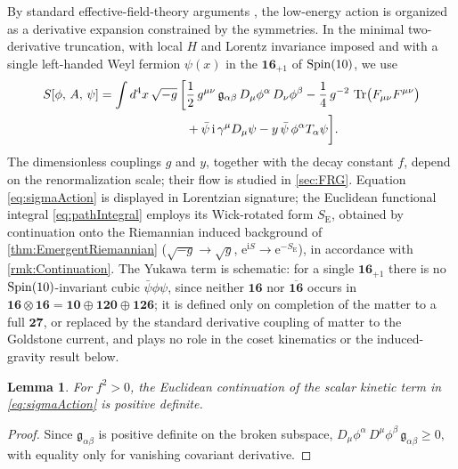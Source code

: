 \documentclass[pdflatex,sn-mathphys-num]{sn-jnl}
\theoremstyle{thmstyleone}
\newtheorem{lemma}[lemma]{Lemma}
\theoremstyle{thmstylethree}%
\theoremstyle{thmstyletwo}%
\begin{document}
By standard effective-field-theory arguments \cite{CWZ69,Weinberg:1996kr}, the
low-energy action is organized as a derivative expansion constrained by the
symmetries. In the minimal two-derivative truncation, with local \(H\) and
Lorentz invariance imposed and with a single left-handed Weyl fermion
\(\psi(x)\) in the \(\mathbf{16}_{+1}\) of \(\operatorname{Spin}(10)\), we use
\begin{equation}\label{eq:sigmaAction}
\begin{aligned}
  S[\phi,\,A,\,\psi]
  = \int d^{4}x\,\sqrt{-g}\,\biggl[
    & \frac12\,g^{\mu\nu}\,\mathfrak g_{\alpha\beta}\,
      D_{\mu}\phi^{\alpha}\,D_{\nu}\phi^{\beta}
    -\frac14\,g^{-2}\,\operatorname{Tr}\bigl(F_{\mu\nu}F^{\mu\nu}\bigr)\\
    & + \bar\psi\,\mathrm i\,\gamma^{\mu}D_{\mu}\psi
    -y\,\bar\psi\,\phi^{\alpha}T_{\alpha}\psi
  \biggr].
\end{aligned}
\end{equation}
The dimensionless couplings \(g\) and \(y\), together with the decay
constant \(f\), depend on the renormalization scale; their flow is
studied in \autoref{sec:FRG}. Equation \eqref{eq:sigmaAction} is displayed in
Lorentzian signature; the Euclidean functional integral \eqref{eq:pathIntegral}
employs its Wick-rotated form \(S_{\mathrm E}\), obtained by continuation onto
the Riemannian induced background of \autoref{thm:EmergentRiemannian}
(\(\sqrt{-g}\to\sqrt{g}\),
\(\mathrm{e}^{\mathrm{i}S}\to\mathrm{e}^{-S_{\mathrm E}}\)), in accordance with
\autoref{rmk:Continuation}. The Yukawa term is schematic: for a single
\(\mathbf{16}_{+1}\) there is no \(\operatorname{Spin}(10)\)-invariant cubic
\(\bar\psi\phi\psi\), since neither \(\mathbf{16}\) nor \(\overline{\mathbf{16}}\)
occurs in \(\mathbf{16}\otimes\mathbf{16}
=\mathbf{10}\oplus\mathbf{120}\oplus\mathbf{126}\); it is defined only on
completion of the matter to a full \(\mathbf{27}\), or replaced by the standard
derivative coupling of matter to the Goldstone current, and plays no role in
the coset kinematics or the induced-gravity result below.

\begin{lemma}\label{lem:positivity}
For $f^{2}>0$, the Euclidean continuation of the scalar kinetic term in
\eqref{eq:sigmaAction} is positive definite.
\end{lemma}
\begin{proof}
Since $\mathfrak g_{\alpha\beta}$ is positive definite on the broken subspace, 
\(
  D_\mu\phi^{\alpha}\,D^\mu\phi^{\beta}\,
  \mathfrak g_{\alpha\beta}\ge 0,
\)
with equality only for vanishing covariant derivative.
\end{proof}
\end{document}
